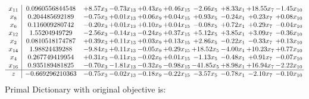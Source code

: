 \documentclass[9pt]{article}
\begin{document}
\[\begin{array}{c| c c@{\hskip 2pt} c@{\hskip 2pt} c@{\hskip 2pt} c@{\hskip 2pt} c@{\hskip 2pt} c@{\hskip 2pt} c@{\hskip 2pt} c@{\hskip 2pt} }
 x_{11}   &  0.0960556844548 & +  8.57 x_{3} & -0.73 x_{13} & +  0.43 x_{9} & +  0.46 x_{15} & -2.66 x_{5} & +  8.33 x_{1} & + 18.55 x_{7} & -1.45 x_{10}\\
 x_{8}   &  0.204485692189 & -0.75 x_{3} & +  0.01 x_{13} & +  0.06 x_{9} & +  0.04 x_{15} & +  0.93 x_{5} & -0.24 x_{1} & +  0.23 x_{7} & +  0.08 x_{10}\\
 x_{6}   &  0.116009280742 & -0.20 x_{3} & +  0.01 x_{13} & +  0.10 x_{9} & +  0.04 x_{15} & -0.08 x_{5} & +  0.72 x_{1} & +  0.29 x_{7} & -0.04 x_{10}\\
 x_{12}   &  1.55204949729 & -2.56 x_{3} & -0.14 x_{13} & -0.24 x_{9} & +  0.37 x_{15} & +  5.12 x_{5} & +  3.85 x_{1} & +  3.09 x_{7} & -0.36 x_{10}\\
 x_{2}   &  0.0810518174787 & +  0.39 x_{3} & +  0.11 x_{13} & +  0.03 x_{9} & +  0.13 x_{15} & +  2.86 x_{5} & -0.22 x_{1} & -0.33 x_{7} & +  0.13 x_{10}\\
 x_{14}   &  1.98824439288 & -9.84 x_{3} & +  0.11 x_{13} & -0.05 x_{9} & +  0.29 x_{15} & + 18.52 x_{5} & -4.00 x_{1} & + 10.23 x_{7} & +  0.77 x_{10}\\
 x_{4}   &  0.267749419954 & +  0.31 x_{3} & -0.11 x_{13} & -0.02 x_{9} & +  0.01 x_{15} & -1.13 x_{5} & -0.48 x_{1} & +  0.91 x_{7} & -0.07 x_{10}\\
 x_{16}   &  0.935189481825 & -0.70 x_{3} & -1.81 x_{13} & -0.32 x_{9} & -0.98 x_{15} & -41.85 x_{5} & +  8.98 x_{1} & + 16.94 x_{7} & -2.22 x_{10}\\
\hline
z    &  -0.669296210363 & -0.75 x_{3} & -0.02 x_{13} & -0.18 x_{9} & -0.22 x_{15} & -3.57 x_{5} & -0.78 x_{1} & -2.10 x_{7} & -0.10 x_{10}\\
\end{array}\]
Primal Dictionary with original objective is:
\end{document}
